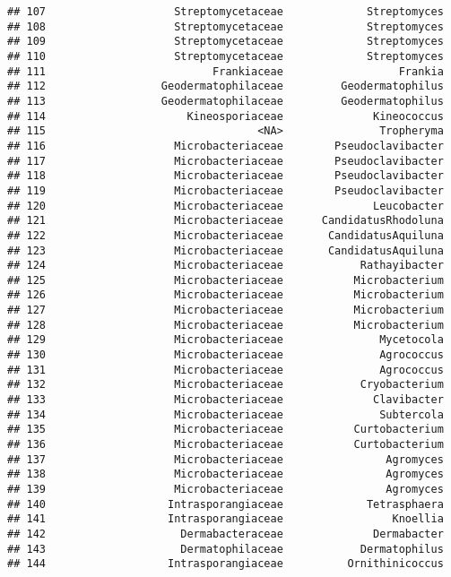 \documentclass[
]{article}
\begin{document}
\begin{verbatim}
## 107                    Streptomycetaceae             Streptomyces
## 108                    Streptomycetaceae             Streptomyces
## 109                    Streptomycetaceae             Streptomyces
## 110                    Streptomycetaceae             Streptomyces
## 111                          Frankiaceae                  Frankia
## 112                  Geodermatophilaceae         Geodermatophilus
## 113                  Geodermatophilaceae         Geodermatophilus
## 114                      Kineosporiaceae              Kineococcus
## 115                                 <NA>               Tropheryma
## 116                    Microbacteriaceae        Pseudoclavibacter
## 117                    Microbacteriaceae        Pseudoclavibacter
## 118                    Microbacteriaceae        Pseudoclavibacter
## 119                    Microbacteriaceae        Pseudoclavibacter
## 120                    Microbacteriaceae              Leucobacter
## 121                    Microbacteriaceae      CandidatusRhodoluna
## 122                    Microbacteriaceae       CandidatusAquiluna
## 123                    Microbacteriaceae       CandidatusAquiluna
## 124                    Microbacteriaceae            Rathayibacter
## 125                    Microbacteriaceae           Microbacterium
## 126                    Microbacteriaceae           Microbacterium
## 127                    Microbacteriaceae           Microbacterium
## 128                    Microbacteriaceae           Microbacterium
## 129                    Microbacteriaceae               Mycetocola
## 130                    Microbacteriaceae               Agrococcus
## 131                    Microbacteriaceae               Agrococcus
## 132                    Microbacteriaceae            Cryobacterium
## 133                    Microbacteriaceae              Clavibacter
## 134                    Microbacteriaceae               Subtercola
## 135                    Microbacteriaceae           Curtobacterium
## 136                    Microbacteriaceae           Curtobacterium
## 137                    Microbacteriaceae                Agromyces
## 138                    Microbacteriaceae                Agromyces
## 139                    Microbacteriaceae                Agromyces
## 140                   Intrasporangiaceae             Tetrasphaera
## 141                   Intrasporangiaceae                 Knoellia
## 142                     Dermabacteraceae              Dermabacter
## 143                     Dermatophilaceae            Dermatophilus
## 144                   Intrasporangiaceae          Ornithinicoccus

\end{verbatim}
\end{document}
